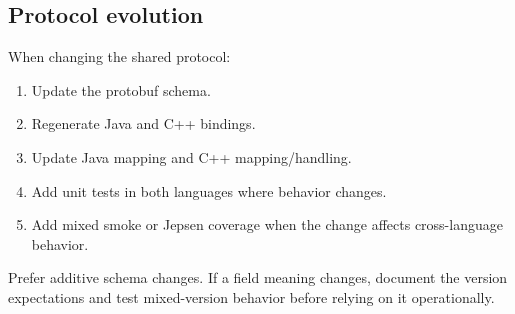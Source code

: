 \subsection{Protocol evolution}

When changing the shared protocol:

\begin{enumerate}
\item Update the protobuf schema.
\item Regenerate Java and C++ bindings.
\item Update Java mapping and C++ mapping/handling.
\item Add unit tests in both languages where behavior changes.
\item Add mixed smoke or Jepsen coverage when the change affects cross-language behavior.
\end{enumerate}

Prefer additive schema changes. If a field meaning changes, document the version
expectations and test mixed-version behavior before relying on it operationally.
